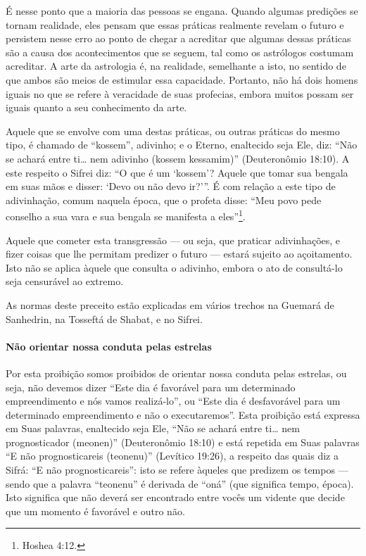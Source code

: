 É nesse ponto que a maioria das pessoas se engana. Quando algumas
predições se tornam realidade, eles pensam que essas práticas realmente
revelam o futuro e persistem nesse erro ao ponto de chegar a acreditar
que algumas dessas práticas são a causa dos acontecimentos que se
seguem, tal como os astrólogos costumam acreditar. A arte da astrologia
é, na realidade, semelhante a isto, no sentido de que ambos são meios de
estimular essa capacidade. Portanto, não há dois homens iguais no que se refere à veracidade de suas
profecias, embora muitos possam ser iguais quanto a seu conhecimento da
arte.

Aquele que se envolve com uma destas práticas, ou outras práticas do
mesmo tipo, é chamado de ``kossem'', adivinho; e o Eterno, enaltecido
seja Ele, diz: ``Não se achará entre ti\ldots{} nem adivinho (kossem
kessamim)'' (Deuteronômio 18:10). A este respeito o Sifrei diz: ``O que
é um `kossem'? Aquele que tomar sua bengala em suas mãos e disser: `Devo
ou não devo ir?'''. É com relação a este tipo de adivinhação, comum
naquela época, que o profeta disse: ``Meu povo pede conselho a sua vara
e sua bengala se manifesta a eles''\footnote{Hoshea 4:12.}.

Aquele que cometer esta transgressão --- ou seja, que praticar
adivinhações, e fizer coisas que lhe permitam predizer o futuro ---
estará sujeito ao açoitamento. Isto não se aplica àquele que consulta o
adivinho, embora o ato de consultá-lo seja censurável ao extremo.

As normas deste preceito estão explicadas em vários trechos na Guemará
de Sanhedrin, na Tosseftá de Shabat, e no Sifrei.

\paragraph{Não orientar nossa conduta pelas estrelas}

Por esta proibição somos proibidos de orientar nossa conduta pelas
estrelas, ou seja, não devemos dizer ``Este dia é favorável para um
determinado empreendimento e nós vamos realizá-lo'', ou ``Este dia é
desfavorável para um determinado empreendimento e não o executaremos''.
Esta proibição está expressa em Suas palavras, enaltecido seja Ele,
``Não se achará entre ti\ldots{} nem prognosticador (meonen)'' (Deuteronômio
18:10) e está repetida em Suas palavras ``E não prognosticareis
(teonenu)'' (Levítico 19:26), a respeito das quais diz a Sifrá: ``E não
prognosticareis'': isto se refere àqueles que predizem os tempos ---
sendo que a palavra ``teonenu'' é derivada de ``oná'' (que significa
tempo, época). Isto significa que não deverá ser encontrado entre vocês
um vidente que decide que um momento é favorável e outro não.

